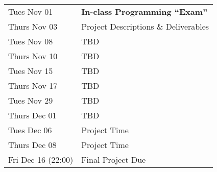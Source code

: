 \begin{longtable}[c]{|l|l|}
    Tues Nov 01     & \textbf{In-class Programming ``Exam''}\\
    Thurs Nov 03    & Project Descriptions \& Deliverables\\
    \hline
    Tues Nov 08     & TBD \\
    Thurs Nov 10    & TBD \\
    \hline
    Tues Nov 15     & TBD \\
    Thurs Nov 17    & TBD \\
    \hline
    Tues Nov 29     & TBD \\
    Thurs Dec 01    & TBD \\
    \hline
    Tues Dec 06     & Project Time\\
    Thurs Dec 08    & Project Time\\
    \hline
    Fri Dec 16 (22:00) & Final Project Due \\
    \hline

\end{longtable}
